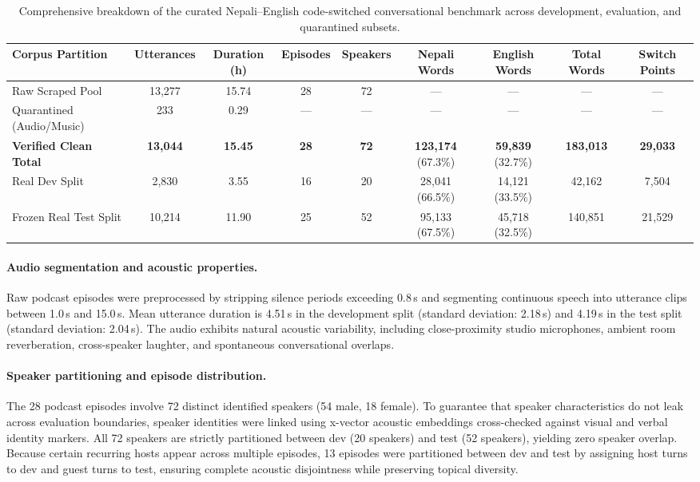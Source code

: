 \documentclass[10pt,twocolumn,a4paper]{article}
\begin{document}
\begin{table}[H]
\centering
\small
\renewcommand{\arraystretch}{1.18}
\setlength{\tabcolsep}{1.8pt}
\caption{Comprehensive breakdown of the curated Nepali--English code-switched conversational benchmark across development, evaluation, and quarantined subsets.}
\label{tab:corpus_breakdown}
\begin{tabular*}{\textwidth}{@{\extracolsep{\fill}}lcccccccc@{}}
\toprule
\textbf{Corpus Partition} & \textbf{Utterances} & \textbf{Duration (h)} & \textbf{Episodes} & \textbf{Speakers} & \textbf{Nepali Words} & \textbf{English Words} & \textbf{Total Words} & \textbf{Switch Points} \\
\midrule
Raw Scraped Pool          & 13,277 & 15.74 & 28 & 72 & --- & --- & --- & --- \\
Quarantined (Audio/Music) & 233    & 0.29  & --- & --- & --- & --- & --- & --- \\
\midrule
\textbf{Verified Clean Total} & \textbf{13,044} & \textbf{15.45} & \textbf{28} & \textbf{72} & \textbf{123,174} (67.3\%) & \textbf{59,839} (32.7\%) & \textbf{183,013} & \textbf{29,033} \\
\quad Real Dev Split          & 2,830  & 3.55  & 16 & 20 & 28,041 (66.5\%)  & 14,121 (33.5\%)  & 42,162  & 7,504 \\
\quad Frozen Real Test Split  & 10,214 & 11.90 & 25 & 52 & 95,133 (67.5\%)  & 45,718 (32.5\%)  & 140,851 & 21,529 \\
\bottomrule
\end{tabular*}
\end{table}

\paragraph{Audio segmentation and acoustic properties.}
Raw podcast episodes were preprocessed by stripping silence periods exceeding 0.8\,s and segmenting continuous speech into utterance clips between 1.0\,s and 15.0\,s. Mean utterance duration is 4.51\,s in the development split (standard deviation: 2.18\,s) and 4.19\,s in the test split (standard deviation: 2.04\,s). The audio exhibits natural acoustic variability, including close-proximity studio microphones, ambient room reverberation, cross-speaker laughter, and spontaneous conversational overlaps.

\paragraph{Speaker partitioning and episode distribution.}
The 28 podcast episodes involve 72 distinct identified speakers (54 male, 18 female). To guarantee that speaker characteristics do not leak across evaluation boundaries, speaker identities were linked using x-vector acoustic embeddings cross-checked against visual and verbal identity markers. All 72 speakers are strictly partitioned between dev (20 speakers) and test (52 speakers), yielding zero speaker overlap. Because certain recurring hosts appear across multiple episodes, 13 episodes were partitioned between dev and test by assigning host turns to dev and guest turns to test, ensuring complete acoustic disjointness while preserving topical diversity.
\end{document}
